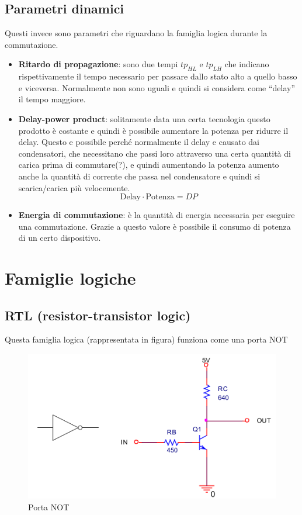 \documentclass[
]{book}
\providecommand{\tightlist}{%
  \setlength{\itemsep}{0pt}\setlength{\parskip}{0pt}}
\begin{document}
\subsection{Parametri dinamici}\label{parametri-dinamici}

Questi invece sono parametri che riguardano la famiglia logica durante
la commutazione.

\begin{itemize}
\tightlist
\item
  \textbf{Ritardo di propagazione}: sono due tempi \(tp_{HL}\) e
  \(tp_{LH}\) che indicano rispettivamente il tempo necessario per
  passare dallo stato alto a quello basso e viceversa. Normalmente non
  sono uguali e quindi si considera come ``delay'' il tempo maggiore.
\item
  \textbf{Delay-power product}: solitamente data una certa tecnologia
  questo prodotto è costante e quindi è possibile aumentare la potenza
  per ridurre il delay. Questo e possibile perché normalmente il delay e
  causato dai condensatori, che necessitano che passi loro attraverso
  una certa quantità di carica prima di commutare(?), e quindi
  aumentando la potenza aumento anche la quantità di corrente che passa
  nel condensatore e quindi si scarica/carica più velocemente.
  \[\text{Delay}\cdot\text{Potenza}=DP\]
\item
  \textbf{Energia di commutazione}: è la quantità di energia necessaria
  per eseguire una commutazione. Grazie a questo valore è possibile il
  consumo di potenza di un certo dispositivo.
\end{itemize}

\section{Famiglie logiche}\label{famiglie-logiche}

\subsection{RTL (resistor-transistor
logic)}\label{rtl-resistor-transistor-logic}

Questa famiglia logica (rappresentata in figura) funziona come una porta
NOT

\begin{figure}
\centering
\includegraphics[width=0.4\linewidth,height=\textheight,keepaspectratio]{immagini/18.png}
\caption{Porta NOT}
\end{figure}
\end{document}
